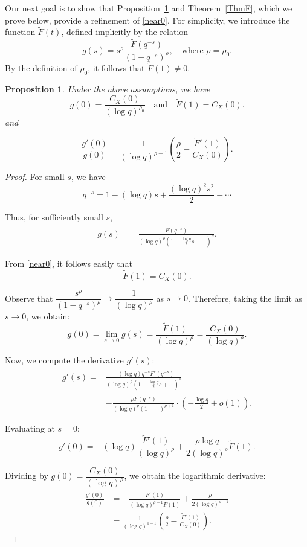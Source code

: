 \documentclass[12pt]{amsart}
\newtheorem{proposition}[theorem]{Proposition}
\begin{document}
Our next goal is to show that Proposition~\ref{PropF} and Theorem~\ref{ThmF}, which we prove below, provide a refinement of \eqref{near0}. For simplicity, we introduce the function $\widetilde{F}(t)$, defined implicitly by the relation
\[
g(s) = s^\rho  \frac{\widetilde{F}(q^{-s})}{(1 - q^{-s})^\rho}, \quad \text{where } \rho = \rho_0.
\]
By the definition of $\rho_0$, it follows that $\widetilde{F}(1) \ne 0$.


\begin{proposition}\label{PropF}
Under the above assumptions, we have
\[
g(0) = \frac{C_X(0)}{(\log q)^{\rho_0}}\quad \text{and}\quad
\widetilde{F}(1) = C_X(0).
\]
and

\[
\frac{g'(0)}{g(0)} 
= \frac{1}{(\log q)^{\rho-1}} \left( \frac{\rho}{2} - \frac{ \widetilde{F}'(1) }{ C_X(0) } \right).
\]
\end{proposition}

\begin{proof}
For small $ s $, we have 
\[
q^{-s} = 1 - (\log q)s + \frac{(\log q)^2 s^2}{2} - \cdots
\]




Thus, for sufficiently small $s$, 
\begin{align*}
g(s) 
&= \frac{\widetilde{F}(q^{-s})}{(\log q)^\rho \left(1 - \frac{\log q}{2}s + \cdots \right)^\rho}.
\end{align*}




 From  \eqref{near0}, it follows easily that
\[
\widetilde{F}(1) = C_X(0).
\]




Observe that $ \dfrac{s^\rho}{(1 - q^{-s})^\rho} \to \dfrac{1}{(\log q)^\rho} $ as $ s \to 0 $. Therefore, taking the limit as $ s \to 0 $, we obtain:
\[
g(0) = \lim_{s \to 0} g(s) = \frac{\widetilde{F}(1)}{(\log q)^\rho} = \frac{C_X(0)}{(\log q)^\rho}.
\]


Now, we  compute the derivative $ g'(s) $:
\[
\begin{split}
g'(s) = 
&\frac{ -(\log q) q^{-s} \widetilde{F}'(q^{-s}) }{ (\log q)^\rho \left(1 - \frac{\log q}{2}s + \cdots \right)^\rho } \\
&- \frac{\rho \widetilde{F}(q^{-s}) }{ (\log q)^\rho \left(1 - \cdots \right)^{\rho+1} } \cdot \left( -\frac{\log q}{2} + o(1) \right).
\end{split}
\]


Evaluating at $ s = 0 $:
\[
g'(0) = -(\log q) \frac{ \widetilde{F}'(1) }{ (\log q)^\rho } + \frac{\rho \log q}{2 (\log q)^\rho} \widetilde{F}(1).
\]

Dividing by $ g(0) = \dfrac{C_X(0)}{(\log q)^\rho} $, we obtain the logarithmic derivative:
\[
\begin{split}
\frac{g'(0)}{g(0)} 
&= -\frac{ \widetilde{F}'(1) }{ (\log q)^{\rho-1} \widetilde{F}(1) } + \frac{\rho}{2 (\log q)^{\rho-1}} \\
&= \frac{1}{(\log q)^{\rho-1}} \left( \frac{\rho}{2} - \frac{ \widetilde{F}'(1) }{ C_X(0) } \right).
\end{split}
\]

\end{proof}
\end{document}
